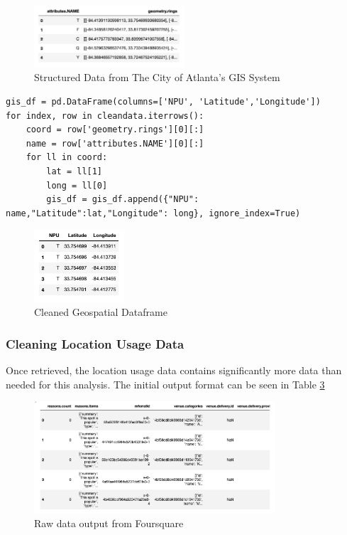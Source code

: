\documentclass[11pt]{amsart}
\begin{document}
\begin{figure}
\includegraphics[width=0.5\textwidth]{gisresults}
\caption{Structured Data from The City of Atlanta's GIS System}
\label{fig:gisresults}
\end{figure}

\begin{lstlisting}[caption={Geospatial Data Cleaning Algorithm}]
gis_df = pd.DataFrame(columns=['NPU', 'Latitude','Longitude'])
for index, row in cleandata.iterrows():
    coord = row['geometry.rings'][0][:]
    name = row['attributes.NAME'][0][:]
    for ll in coord:
        lat = ll[1]
        long = ll[0]
        gis_df = gis_df.append({"NPU": name,"Latitude":lat,"Longitude": long}, ignore_index=True)
\end{lstlisting}

\begin{figure}
\includegraphics[width=0.3\textwidth]{cleanedgeodata}
\caption{Cleaned Geospatial Dataframe}
\label{fig:cleanedgeodata}
\end{figure}
\FloatBarrier
\subsubsection{Cleaning Location Usage Data}
Once retrieved, the location usage data contains significantly more data than needed for this analysis. The initial output format can be seen in Table \ref{tab:fsraw}

\begin{figure}[h]
\includegraphics[width=0.8\textwidth]{Foursquare_API_output_table_raw}
\caption{Raw data output from Foursquare}
\label{tab:fsraw}
\end{figure}
\end{document}
